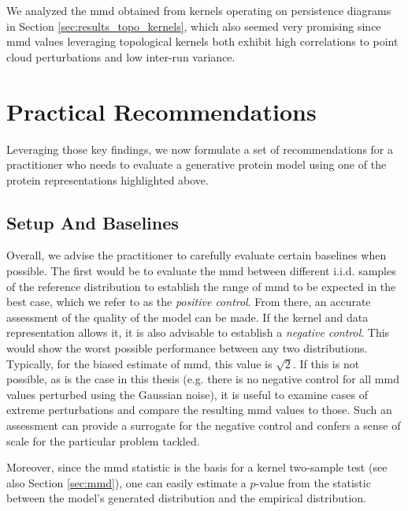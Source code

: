 We analyzed the \acrshort{mmd} obtained from kernels operating on persistence diagrams in
Section \ref{sec:results_topo_kernels}, which also seemed very promising since
\acrshort{mmd} values leveraging topological kernels both exhibit high correlations to
point cloud perturbations and low inter-run variance.

\section{Practical Recommendations}\label{sec:discussion_recommendations}

Leveraging those key findings, we now formulate a set of recommendations for a
practitioner who needs to evaluate a generative protein model using one of the
protein representations highlighted above.


\subsection{Setup And Baselines}\label{sec:discussion_baselines}

Overall, we advise the practitioner to carefully evaluate certain baselines when
possible. The first would be to evaluate the \acrshort{mmd} between different i.i.d.
samples of the reference distribution to establish the range of \acrshort{mmd} to be
expected in the best case, which we refer to as the \emph{positive control}.
From there, an accurate assessment of the quality of the model can be made. If
the kernel and data representation allows it, it is also advisable to establish
a \emph{negative control}. This would show the worst possible performance
between any two distributions. Typically, for the biased estimate of \acrshort{mmd}, this
value is $\sqrt{2}$. If this is not possible, as is the case in this thesis
(e.g. there is no negative control for all \acrshort{mmd} values perturbed using the Gaussian noise), it
is useful to examine cases of extreme perturbations and compare the resulting
\acrshort{mmd} values to those. Such an assessment can provide a surrogate for the negative
control and confers a sense of scale for the particular problem tackled.

Moreover, since the \acrshort{mmd} statistic is the basis for a kernel two-sample test
\citep{gretton2012kernel} (see also Section \ref{sec:mmd}), one can easily
estimate a $p$-value from the statistic between the model's generated
distribution and the empirical distribution.

